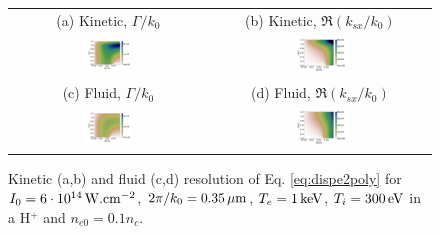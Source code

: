 \documentclass[
 reprint,
 amsmath,amssymb,
 aps,
]{revtex4-1}
\begin{document}
\begin{figure}
\begin{tabular}{cc}
(a) Kinetic, $\Gamma/k_0$ &
(b)  Kinetic, $\Re(k_{sx}/k_0)$ \\
\includegraphics[width=0.24\textwidth]{1a.png}&
\includegraphics[width=0.24\textwidth]{1b.png}\\
(c) Fluid, $\Gamma/k_0$  &
(d) Fluid, $\Re(k_{sx}/k_0)$  \\
\includegraphics[width=0.24\textwidth]{1c.png}&
\includegraphics[width=0.24\textwidth]{1d.png}
\end{tabular}
\caption{ \label{fig:dispe}  
Kinetic (a,b) and fluid (c,d) resolution of Eq. \eqref{eq:dispe2poly} for  $I_0 = 6\cdot 10^{14}\, \rm W.cm^{-2}$, $2\pi/k_0=0.35 \,\rm\mu m$, $T_e =1\,\rm  keV$, $ T_i=300\,  \rm eV$ in a H$^+$ and $n_{e0}=0.1n_c$.
 }
\end{figure}
\end{document}
